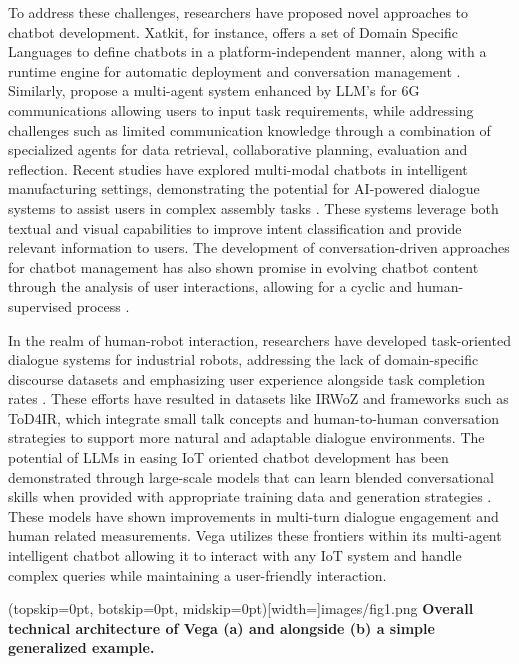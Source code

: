 \documentclass{ieeeaccess}
\begin{document}
To address these challenges, researchers have proposed novel approaches to chatbot development. Xatkit, for instance, offers a set of Domain Specific Languages to define chatbots in a platform-independent manner, along with a runtime engine for automatic deployment and conversation management \cite{8960373}. Similarly, \citet{jiang2023largelanguagemodelenhanced} propose a multi-agent system enhanced by LLM's for 6G communications allowing users to input task requirements, while addressing challenges such as limited communication knowledge through a combination of specialized agents for data retrieval, collaborative planning, evaluation and reflection. Recent studies have explored multi-modal chatbots in intelligent manufacturing settings, demonstrating the potential for AI-powered dialogue systems to assist users in complex assembly tasks \cite{9440470}. These systems leverage both textual and visual capabilities to improve intent classification and provide relevant information to users. The development of conversation-driven approaches for chatbot management has also shown promise in evolving chatbot content through the analysis of user interactions, allowing for a cyclic and human-supervised process \cite{9681834}.

In the realm of human-robot interaction, researchers have developed task-oriented dialogue systems for industrial robots, addressing the lack of domain-specific discourse datasets and emphasizing user experience alongside task completion rates \cite{9869659}. These efforts have resulted in datasets like IRWoZ and frameworks such as ToD4IR, which integrate small talk concepts and human-to-human conversation strategies to support more natural and adaptable dialogue environments. The potential of LLMs in easing IoT oriented chatbot development has been demonstrated through large-scale models that can learn blended conversational skills when provided with appropriate training data and generation strategies \cite{roller-etal-2021-recipes}. These models have shown improvements in multi-turn dialogue engagement and human related measurements. Vega utilizes these frontiers within its multi-agent intelligent chatbot allowing it to interact with any IoT system and handle complex queries while maintaining a user-friendly interaction.

\Figure[t!](topskip=0pt, botskip=0pt,
midskip=0pt)[width=\textwidth]{{images/fig1.png}}
{ \centering \textbf{Overall technical architecture of Vega (a) and alongside (b) a simple generalized example.}\label{fig1}}
\end{document}
